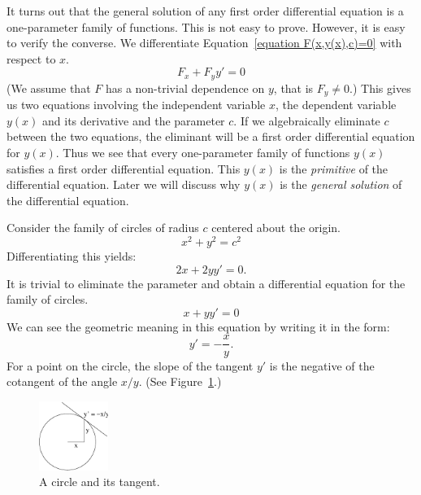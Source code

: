 It turns out that the general solution of any first order differential
equation is a one-parameter family of functions.  This is not easy to
prove.  However, it is easy to verify the converse.
We differentiate Equation~\ref{equation F(x,y(x),c)=0} with respect 
to $x$.
\[
F_x + F_y y' = 0
\]
(We assume that $F$ has a non-trivial dependence on $y$, that is $F_y
\neq 0$.)  This gives us two equations involving the independent
variable $x$, the dependent variable $y(x)$ and its derivative and the
parameter $c$.  If we algebraically eliminate $c$ between the two
equations, the eliminant will be a first order differential equation
for $y(x)$.  Thus we see that every one-parameter family of functions
$y(x)$ satisfies a first order differential equation.  This $y(x)$ is
the \textit{primitive} of the differential equation.  Later we will
discuss why $y(x)$ is the \textit{general solution} of the
differential equation.




\begin{Example}
  Consider the family of circles of radius $c$ centered about the origin.
  \[
  x^2 + y^2 = c^2
  \]
  Differentiating this yields:
  \[
  2 x + 2 y y' = 0.
  \]
  It is trivial to eliminate the parameter and obtain a differential equation
  for the family of circles.
  \[
  x + y y' = 0
  \]
  We can see the geometric meaning in this equation by writing it in the 
  form:
  \[
  y' = - \frac{x}{y}.
  \]
  For a point on the circle, the slope of the tangent $y'$
  is the negative of the cotangent of the angle $x/y$.
  (See Figure~\ref{figure circle tangent}.)
  \begin{figure}[tb!]
    \begin{center}
      \includegraphics[width=0.2\textwidth]{ode/first_order/circle_tangent}
    \end{center}
    \caption{A circle and its tangent.}
    \label{figure circle tangent}
  \end{figure}
\end{Example}




